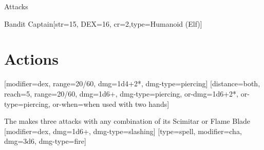 \begin{ExampleBlock}{Attacks}
\begin{RpgStat}{Bandit Captain}[str=15, DEX=16, cr=2,type={Humanoid (Elf)}]
    \section{Actions}
        [modifier=dex, range=20/60, dmg=1d4+2*, dmg-type=piercing]
        [distance=both, reach=5, range=20/60, dmg=1d6+, dmg-type=piercing, or-dmg=1d6+2*, or-type=piercing, or-when={when used with two hands}]

        \begin{multiattack}{The \name{} makes three attacks with any combination of its Scimitar or Flame Blade}
        [modifier=dex, dmg=1d6+, dmg-type=slashing]
        [type=spell, modifier=cha, dmg=3d6, dmg-type=fire]
        \end{multiattack}
\end{RpgStat}


\end{ExampleBlock}
